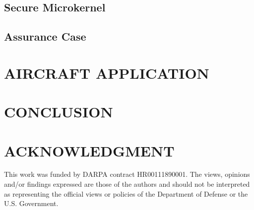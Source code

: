 \documentclass{IEEEcsmag}
\begin{document}
\subsection{Secure Microkernel}


\subsection{Assurance Case}


\section{AIRCRAFT APPLICATION}



\section{CONCLUSION}


\section{ACKNOWLEDGMENT}

This work was funded by DARPA contract HR00111890001. The
views, opinions and/or findings expressed are those of the authors
and should not be interpreted as representing the official views or
policies of the Department of Defense or the U.S. Government.





\end{document}

